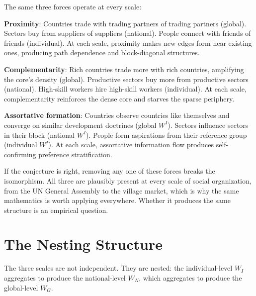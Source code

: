 \documentclass[../structural_economics_book.tex]{subfiles}
\begin{document}
\begin{intuition}
The same three forces operate at every scale:

\textbf{Proximity}: Countries trade with trading partners of trading partners (global). Sectors buy from suppliers of suppliers (national). People connect with friends of friends (individual). At each scale, proximity makes new edges form near existing ones, producing path dependence and block-diagonal structures.

\textbf{Complementarity}: Rich countries trade more with rich countries, amplifying the core's density (global). Productive sectors buy more from productive sectors (national). High-skill workers hire high-skill workers (individual). At each scale, complementarity reinforces the dense core and starves the sparse periphery.

\textbf{Assortative formation}: Countries observe countries like themselves and converge on similar development doctrines (global $W^I$). Sectors influence sectors in their block (national $W^I$). People form aspirations from their reference group (individual $W^I$). At each scale, assortative information flow produces self-confirming preference stratification.

If the conjecture is right, removing any one of these forces breaks the isomorphism. All three are plausibly present at every scale of social organization, from the UN General Assembly to the village market, which is why the same mathematics is worth applying everywhere. Whether it produces the same structure is an empirical question.
\end{intuition}


\section{The Nesting Structure}
\label{ch19:sec:nesting}

The three scales are not independent. They are nested: the individual-level $W_I$ aggregates to produce the national-level $W_N$, which aggregates to produce the global-level $W_G$.
\end{document}
